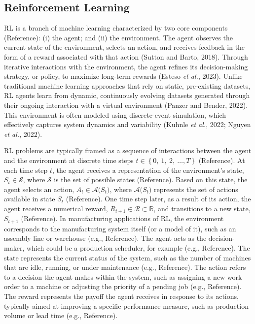 \subsection{Reinforcement Learning}\label{reinforcement-learning}

RL is a branch of machine learning characterized by two core components
(\colorbox{yellow!40}{Reference}): (i) the agent; and (ii) the environment. The agent
observes the current state of the environment, selects an action, and
receives feedback in the form of a reward associated with that action
(Sutton and Barto, 2018). Through iterative interactions with the
environment, the agent refines its decision-making strategy, or policy,
to maximize long-term rewards (Esteso \emph{et al.}, 2023). Unlike
traditional machine learning approaches that rely on static,
pre-existing datasets, RL agents learn from dynamic, continuously
evolving datasets generated through their ongoing interaction with a
virtual environment (Panzer and Bender, 2022). This environment is often
modeled using discrete-event simulation, which effectively captures
system dynamics and variability (Kuhnle \emph{et al.}, 2022; Nguyen
\emph{et al.}, 2022).

RL problems are typically framed as a sequence of interactions between
the agent and the environment at discrete time steps
\(t \in \left\{ 0,\ 1,\ 2,\ \ldots,T \right\}\) (\colorbox{yellow!40}{Reference}). At
each time step \(t\), the agent receives a representation of the
environment's state, \(S_{t}\mathcal{\in S}\), where \(\mathcal{S}\) is
the set of possible states (\colorbox{yellow!40}{Reference}). Based on this state, the
agent selects an action, \(A_{t}\mathcal{\in A(}S_{t})\), where
\(\mathcal{A(}S_{t})\) represents the set of actions available in state
\(S_{t}\) (\colorbox{yellow!40}{Reference}). One time step later, as a result of its
action, the agent receives a numerical reward,
\(R_{t + 1}\mathcal{\in R \subset}\mathbb{R}\), and transitions to a new
state, \(S_{t + 1}\) (\colorbox{yellow!40}{Reference}). In manufacturing applications of
RL, the environment corresponds to the manufacturing system itself (or a
model of it), such as an assembly line or warehouse (\colorbox{yellow!40}{e.g.,
Reference}). The agent acts as the decision-maker, which could be a
production scheduler, for example (\colorbox{yellow!40}{e.g., Reference}). The state
represents the current status of the system, such as the number of
machines that are idle, running, or under maintenance (\colorbox{yellow!40}{e.g.,
Reference}). The action refers to a decision the agent makes within the
system, such as assigning a new work order to a machine or adjusting the
priority of a pending job (\colorbox{yellow!40}{e.g., Reference}). The reward represents
the payoff the agent receives in response to its actions, typically
aimed at improving a specific performance measure, such as production
volume or lead time (\colorbox{yellow!40}{e.g., Reference}).

